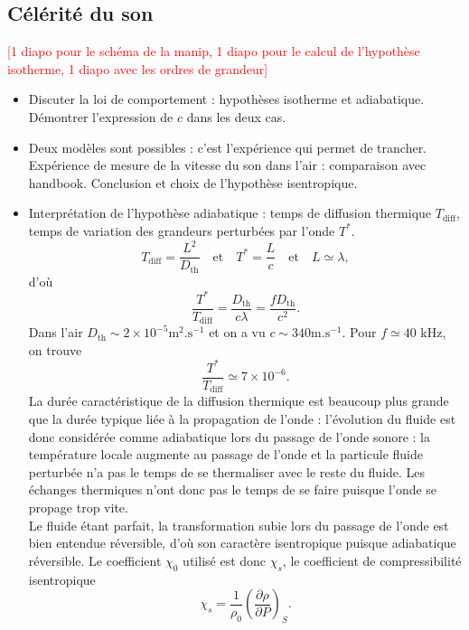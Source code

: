 \documentclass[11pt,a4paper]{report}
\begin{document}
\subsection{Célérité du son}
\textcolor{red}{[1 diapo pour le schéma de la manip, 1 diapo pour le calcul de l'hypothèse isotherme, 1 diapo avec les ordres de grandeur]}\\
\begin{itemize}
	\item Discuter la loi de comportement : hypothèses isotherme et adiabatique. Démontrer l'expression de $c$ dans les deux cas.
	
	\item Deux modèles sont possibles : c'est l'expérience qui permet de trancher. Expérience de mesure de la vitesse du son dans l'air : comparaison avec handbook. Conclusion et choix de l'hypothèse isentropique.
	
	\item Interprétation de l'hypothèse adiabatique : temps de diffusion thermique $T_\text{diff}$, temps de variation des grandeurs perturbées par l'onde $T^*$.
	\begin{equation}
		T_\text{diff} = \frac{L^2}{D_\text{th}} \quad\text{et}\quad T^* = \frac{L}{c} \quad\text{et}\quad L \simeq \lambda,
	\end{equation}
	d'où
	\begin{equation}
		\frac{T^*}{T_\text{diff}} = \frac{D_\text{th}}{c\lambda} = \frac{f D_\text{th}}{c^2}.
	\end{equation}
	Dans l'air $D_\text{th} \sim 2\times 10^{-5} \text{m}^2.\text{s}^{-1}$ et on a vu $c \sim 340 \text{m}.\text{s}^{-1}$. Pour $f \simeq 40$ kHz, on trouve
	\begin{equation}
		\frac{T^*}{T_\text{diff}} \simeq 7\times 10^{-6}.
	\end{equation}
	La durée caractéristique de la diffusion thermique est beaucoup plus grande que la durée typique liée à la propagation de l'onde : l’évolution du fluide est donc considérée comme 				adiabatique lors du passage de l’onde sonore : la température locale augmente au passage de l'onde et la particule fluide perturbée n'a pas le temps de se thermaliser avec le reste du 		fluide. Les échanges thermiques n'ont donc pas le temps de se faire puisque l'onde se propage trop vite.\\
	
	Le fluide étant parfait, la transformation subie lors du passage de l'onde est bien entendue réversible, d'où son caractère isentropique puisque adiabatique réversible. Le coefficient
	$\chi_0$ utilisé est donc $\chi_s$, le coefficient de compressibilité isentropique
	\begin{equation}
		\chi_s = \frac{1}{\rho_0}\left(\frac{\partial \rho}{\partial P}\right)_S.
	\end{equation}	 


\end{itemize}
\end{document}
